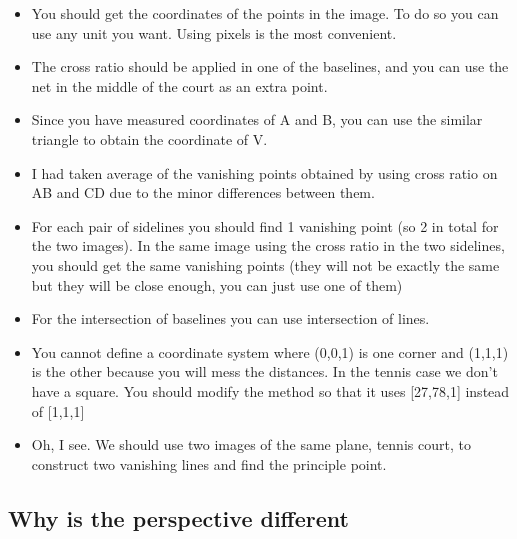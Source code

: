 \documentclass[12pt, oneside]{article}
\begin{document}
\begin{itemize}
    \item You should get the coordinates of the points in the image. To do so you can use 
        any unit you want. Using pixels is the most convenient. 
    \item The cross ratio should  be applied in one of the baselines, and you can use 
        the net in the middle of the court as an extra point.
    \item Since you have measured coordinates of A and B, you can use the similar triangle 
        to obtain the coordinate of V.
    \item I had taken average of the vanishing points obtained by using cross ratio on AB 
        and CD due to the minor differences between them.
    \item For each pair of sidelines you should find 1 vanishing point (so 2 in total 
        for the two images). In the same image using the cross ratio in the two sidelines, 
        you  should get the same vanishing points (they will not be exactly the same but 
        they will be close enough, you can just use one of them)
    \item For the intersection of baselines you can use intersection of lines.
    \item You cannot define a coordinate system where (0,0,1) is one corner and (1,1,1) 
        is the other because you will mess the distances. In the tennis case we don't 
        have a square. You should modify the method so that it uses [27,78,1] 
        instead of [1,1,1]
    \item  Oh, I see. We should use two images of the same plane, tennis court, to construct 
        two vanishing lines and find the principle point.
\end{itemize}


\subsection{Why is the perspective different}
\end{document}
